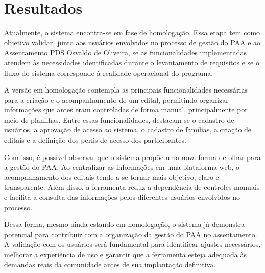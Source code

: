 \chapter{Resultados}
\label{chap6}

Atualmente, o sistema encontra-se em fase de homologação. Essa etapa tem como objetivo validar, junto aos usuários envolvidos no processo de gestão do PAA e ao Assentamento PDS Osvaldo de Oliveira, se as funcionalidades implementadas atendem às necessidades identificadas durante o levantamento de requisitos e se o fluxo do sistema corresponde à realidade operacional do programa.

A versão em homologação contempla as principais funcionalidades necessárias para a criação e o acompanhamento de um edital, permitindo organizar informações que antes eram controladas de forma manual, principalmente por meio de planilhas. Entre essas funcionalidades, destacam-se o cadastro de usuários, a aprovação de acesso ao sistema, o cadastro de famílias, a criação de editais e a definição dos perfis de acesso dos participantes.

Com isso, é possível observar que o sistema propõe uma nova forma de olhar para a gestão do PAA. Ao centralizar as informações em uma plataforma web, o acompanhamento dos editais tende a se tornar mais objetivo, claro e transparente. Além disso, a ferramenta reduz a dependência de controles manuais e facilita a consulta das informações pelos diferentes usuários envolvidos no processo.

Dessa forma, mesmo ainda estando em homologação, o sistema já demonstra potencial para contribuir com a organização da gestão do PAA no assentamento. A validação com os usuários será fundamental para identificar ajustes necessários, melhorar a experiência de uso e garantir que a ferramenta esteja adequada às demandas reais da comunidade antes de sua implantação definitiva.


